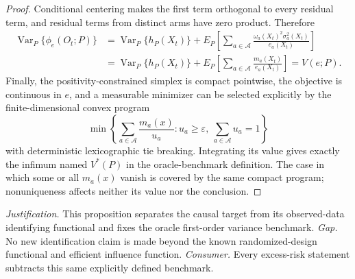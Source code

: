 \documentclass{article}
\begin{document}
\begin{proof}
Conditional centering makes the first term orthogonal to every residual term, and residual terms from distinct arms have zero product.  Therefore
\[
\begin{aligned}
\operatorname{Var}_P\{\phi_e(O_t;P)\}
&=\operatorname{Var}_P\{h_P(X_t)\}
 +E_P\!\left[
  \sum_{a\in\mathcal A}
  \frac{\omega_a(X_t)^2\sigma_a^2(X_t)}{e_a(X_t)}
 \right]\\
&=\operatorname{Var}_P\{h_P(X_t)\}
 +E_P\!\left[\sum_{a\in\mathcal A}\frac{m_a(X_t)}{e_a(X_t)}\right]
=V(e;P).
\end{aligned}
\]
Finally, the positivity-constrained simplex is compact pointwise, the objective is continuous in \(e\), and a measurable minimizer can be selected explicitly by the finite-dimensional convex program
\[
\min\left\{\sum_{a\in\mathcal A}\frac{m_a(x)}{u_a}:
u_a\geq\varepsilon,\ \sum_{a\in\mathcal A}u_a=1\right\}
\]
with deterministic lexicographic tie breaking.  Integrating its value gives exactly the infimum named \(V^*(P)\) in the oracle-benchmark definition.  The case in which some or all \(m_a(x)\) vanish is covered by the same compact program; nonuniqueness affects neither its value nor the conclusion.
\end{proof}
\par\smallskip\noindent \textit{Justification.} This proposition separates the causal target from its observed-data identifying functional and fixes the oracle first-order variance benchmark. \textit{Gap.} No new identification claim is made beyond the known randomized-design functional and efficient influence function. \textit{Consumer.} Every excess-risk statement subtracts this same explicitly defined benchmark.
\end{document}
